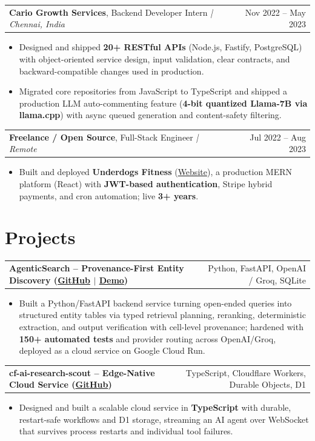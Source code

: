 \documentclass[letterpaper,11pt]{article}
\makeatletter
\newcommand{\expItem}[4]{%
  \vspace{3pt}
  \begin{tabular*}{\textwidth}{@{}l@{\extracolsep{\fill}}r@{}}
    \textbf{#1}, #2 \textit{| #3} & #4 \\
  \end{tabular*}\par\vspace{-2pt}
}
\newcommand{\projItem}[2]{%
  \vspace{6pt}
  \begin{tabular*}{\textwidth}{@{}l@{\extracolsep{\fill}}r@{}}
    \textbf{#1} & #2 \\
  \end{tabular*}\par\vspace{-2pt}
}
\makeatother
\begin{document}
\expItem{Cario Growth Services}{Backend Developer Intern}{Chennai, India}{Nov 2022 -- May 2023}
\begin{itemize}
  \item Designed and shipped \textbf{20+ RESTful APIs} (Node.js, Fastify, PostgreSQL) with object-oriented service design, input validation, clear contracts, and backward-compatible changes used in production.
  \item Migrated core repositories from JavaScript to TypeScript and shipped a production LLM auto-commenting feature (\textbf{4-bit quantized Llama-7B via llama.cpp}) with async queued generation and content-safety filtering.
\end{itemize}

\expItem{Freelance / Open Source}{Full-Stack Engineer}{Remote}{Jul 2022 -- Aug 2023}
\begin{itemize}
  \item Built and deployed \textbf{Underdogs Fitness} (\href{https://www.underdogsfitness.in/}{Website}), a production MERN platform (React) with \textbf{JWT-based authentication}, Stripe hybrid payments, and cron automation; live \textbf{3+ years}.
\end{itemize}

\section{Projects}

\projItem{AgenticSearch -- Provenance-First Entity Discovery {\normalfont\small(\href{https://github.com/Deva-1903/ciir_agentic_search}{GitHub} $\vert$ \href{https://agentic-search-negglszkwa-uc.a.run.app}{Demo})}}{Python, FastAPI, OpenAI / Groq, SQLite}
\begin{itemize}
  \item Built a Python/FastAPI backend service turning open-ended queries into structured entity tables via typed retrieval planning, reranking, deterministic extraction, and output verification with cell-level provenance; hardened with \textbf{150+ automated tests} and provider routing across OpenAI/Groq, deployed as a cloud service on Google Cloud Run.
\end{itemize}

\projItem{cf-ai-research-scout -- Edge-Native Cloud Service {\normalfont\small(\href{https://github.com/Deva-1903/cf_ai_research_scout}{GitHub})}}{TypeScript, Cloudflare Workers, Durable Objects, D1}
\begin{itemize}
  \item Designed and built a scalable cloud service in \textbf{TypeScript} with durable, restart-safe workflows and D1 storage, streaming an AI agent over WebSocket that survives process restarts and individual tool failures.
\end{itemize}
\end{document}
